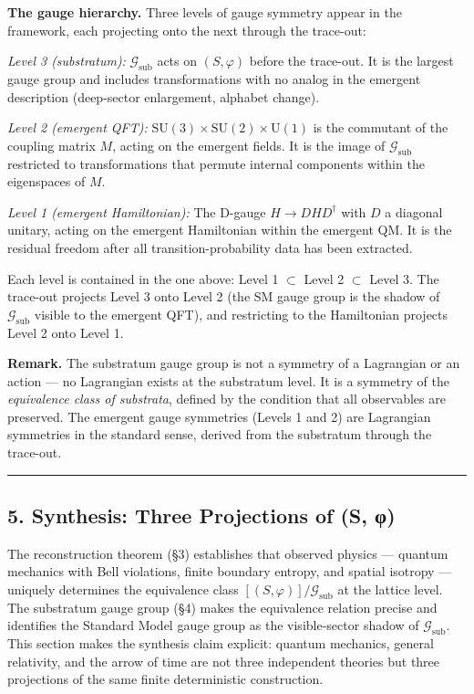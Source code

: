 \documentclass[
]{article}
\begin{document}
\textbf{The gauge hierarchy.} Three levels of gauge symmetry appear in
the framework, each projecting onto the next through the trace-out:

\emph{Level 3 (substratum):} \(\mathcal{G}_{\text{sub}}\) acts on
\((S, \varphi)\) before the trace-out. It is the largest gauge group and
includes transformations with no analog in the emergent description
(deep-sector enlargement, alphabet change).

\emph{Level 2 (emergent QFT):}
\(\text{SU}(3) \times \text{SU}(2) \times \text{U}(1)\) is the commutant
of the coupling matrix \(M\), acting on the emergent fields. It is the
image of \(\mathcal{G}_{\text{sub}}\) restricted to transformations that
permute internal components within the eigenspaces of \(M\).

\emph{Level 1 (emergent Hamiltonian):} The D-gauge \(H \to DHD^\dagger\)
with \(D\) a diagonal unitary, acting on the emergent Hamiltonian within
the emergent QM. It is the residual freedom after all
transition-probability data has been extracted.

Each level is contained in the one above: Level 1 \(\subset\) Level 2
\(\subset\) Level 3. The trace-out projects Level 3 onto Level 2 (the SM
gauge group is the shadow of \(\mathcal{G}_{\text{sub}}\) visible to the
emergent QFT), and restricting to the Hamiltonian projects Level 2 onto
Level 1.

\textbf{Remark.} The substratum gauge group is not a symmetry of a
Lagrangian or an action --- no Lagrangian exists at the substratum
level. It is a symmetry of the \emph{equivalence class of substrata},
defined by the condition that all observables are preserved. The
emergent gauge symmetries (Levels 1 and 2) are Lagrangian symmetries in
the standard sense, derived from the substratum through the trace-out.

\begin{center}\rule{0.5\linewidth}{0.5pt}\end{center}

\hypertarget{synthesis-three-projections-of-s-ux3c6}{%
\subsection{5. Synthesis: Three Projections of (S,
φ)}\label{synthesis-three-projections-of-s-ux3c6}}

The reconstruction theorem (§3) establishes that observed physics ---
quantum mechanics with Bell violations, finite boundary entropy, and
spatial isotropy --- uniquely determines the equivalence class
\([(S, \varphi)]/\mathcal{G}_{\text{sub}}\) at the lattice level. The
substratum gauge group (§4) makes the equivalence relation precise and
identifies the Standard Model gauge group as the visible-sector shadow
of \(\mathcal{G}_{\text{sub}}\). This section makes the synthesis claim
explicit: quantum mechanics, general relativity, and the arrow of time
are not three independent theories but three projections of the same
finite deterministic construction.
\end{document}
